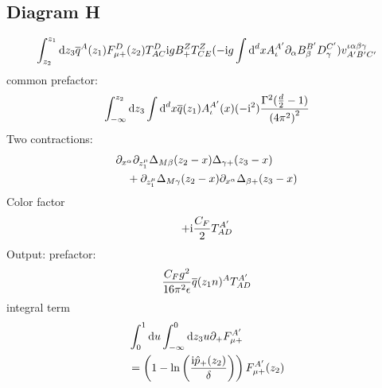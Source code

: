 \subsection{Diagram H}
\begin{align}
\int_{z_2}^{z_1} \text{d} z_3 \overline q^A(z_1) F_{\mu +}^D(z_2) T^D_{AC}\text{i} g B_+^Z T^Z_{CE} (-\text{i} g \int \text{d} ^d x A^{A'}_\iota \partial_\alpha B_\beta^{B'}D_\gamma^{C'})v^{\iota\alpha\beta\gamma}_{A'B'C'}
\end{align}
common prefactor:
\begin{align}
\int_{-\infty}^{z_2} \text{d} z_3  \int \text{d} ^d x \overline q(z_1) A^{A'}_\iota(x)(-\text{i}^2)\frac{\Gamma^2(\frac{d}{2}-1)}{\left(4\pi^2\right)^{2}}
\end{align}
Two contractions:
\begin{align}
&\partial_{x^\alpha} \partial_{z_1^\mu} \Delta_{M\beta}(z_2 -x) \Delta_{\gamma +}(z_3-x)
\\&~~~
+\partial_{z_1^\mu} \Delta_{M\gamma}(z_2 -x) \partial_{x^\alpha}\Delta_{\beta +}(z_3-x)
\end{align}
Color factor
\begin{align}
+\text{i} \frac{C_F}{2} T^{A'}_{AD}
\end{align}
Output:
prefactor:
\begin{align}
\frac{C_F g^2}{16 \pi^2 \epsilon}\overline q(z_1n)^A T^{A'}_{AD}
\end{align}
integral term
\begin{align}
&\int_0^1 \text{d} u \int_{-\infty}^{0} \text{d} z_3 u \partial_+ F_{\mu +}^{A'} 
\\
&=\left(1-\ln\left(\frac{\text{i} \hat p_{+}(z_2)}{\delta}\right)\right)F_{\mu +}^{A'}(z_2) 
\end{align}



